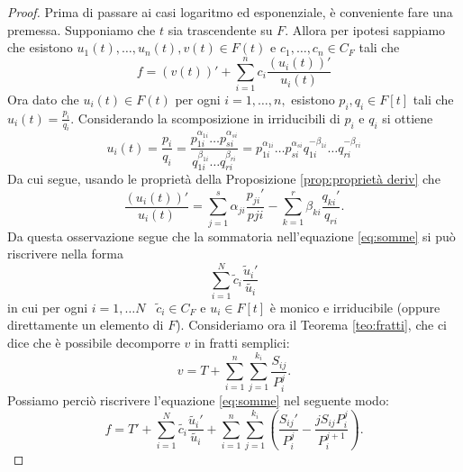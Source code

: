 \documentclass[10pt,oneside]{article}
\theoremstyle{definition}
\theoremstyle{plain}
\theoremstyle{definition}
\theoremstyle{plain}
\theoremstyle{plain}
\begin{document}
\begin{proof}
 
Prima di passare ai casi logaritmo ed esponenziale, è conveniente fare una premessa. Supponiamo che $t$ sia trascendente su $F$. Allora per ipotesi sappiamo che esistono $u_1(t),\dots, u_n(t), v(t) \in F(t)$ e $c_1,\dots, c_n \in C_F$ tali che
\begin{equation}\label{eq:somme}
f= (v(t))'+\sum_{i=1}^n c_i \frac{(u_i(t))'}{u_i(t)} 
\end{equation}
Ora dato che $u_i(t)\in F(t)$ per ogni $i=1,\dots,n, $ esistono $p_i, q_i \in F[t]$ tali che $u_i(t)=\frac{p_i}{q_i}$. Considerando la scomposizione in irriducibili di $p_i$ e $q_i$ si ottiene 
\[u_i(t)=\frac{p_i}{q_i}=\frac{p_{1i}^{\alpha_{1i}}\dots p_{si}^{\alpha_{si}}}{q_{1i}^{\beta_{1i}}\dots q_{ri}^{\beta_{ri}}}=p_{1i}^{\alpha_{1i}}\dots p_{si}^{\alpha_{si}} q_{1i}^{-\beta_{1i}}\dots q_{ri}^{-\beta_{ri}} \]
Da cui segue, usando le proprietà della Proposizione \ref{prop:proprietà deriv} che
\[\frac{(u_i(t))'}{u_i(t)}= \sum_{j=1}^s \alpha_{ji}\frac{p_{ji}'}{pji}- \sum_{k=1}^r \beta_{ki}\frac{q_{ki}'}{q_{ri}}. \]
Da questa osservazione segue che la sommatoria nell'equazione \eqref{eq:somme} si può riscrivere nella forma
\[\sum_{i=1}^N \tilde{c}_i \frac{\tilde{u}_i'}{\tilde{u_i}} \] 
in cui per ogni $i=1, \dots N$ \ $\tilde{c}_i \in C_F$ e $u_i \in F[t]$ è monico e irriducibile (oppure direttamente un elemento di $F$). Consideriamo ora  il Teorema \ref{teo:fratti}, che ci dice che è possibile decomporre $v$ in fratti semplici:
\[v=T+\sum_{i=1}^n\sum_{j=1}^{k_i} \frac{S_{ij}}{P_i^{j}} .\]
Possiamo perciò riscrivere l'equazione \eqref{eq:somme} nel seguente modo:
\begin{equation}\label{eq:finaleliov}
f = T' + \sum_{i=1}^N \tilde{c_i}\frac{\tilde{u_i}'}{\tilde{u_i}}+  \sum_{i=1}^n\sum_{j=1}^{k_i} \left(\frac{S_{ij}'}{P_i^j} - \frac{j S_{ij}P_i^j}{P_i^{j+1}} \right).\end{equation}

\end{proof}
\end{document}
